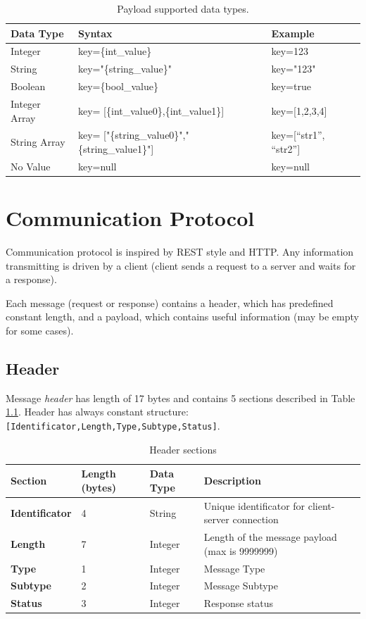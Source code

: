 \documentclass[english, sem, kiv, he, iso690alph, pdf, viewonly]{fasthesis}
\begin{document}
\begin{table}[h]
	\centering
	\begin{tabular}{|l|l|l|}
		\hline
		\textbf{Data Type} & \textbf{Syntax} & \textbf{Example} 	\\ \hline
		Integer & key=\{int\_value\} & key=123 \\ \hline
		String 	& key="\{string\_value\}" & key="123" \\ \hline
		Boolean	& key=\{bool\_value\} & key=true \\ \hline
		Integer Array	& key= [\{int\_value0\},\{int\_value1\}] & key=[1,2,3,4] \\ \hline
		String Array	& key= ["\{string\_value0\}","\{string\_value1\}"] & key=[“str1”, “str2”] \\ \hline
		No Value	& key=null & key=null \\ \hline
	\end{tabular}
	\caption{Payload supported data types.}
	\label{tab:payload_data_types}
\end{table}

\chapter{Communication Protocol}

Communication protocol is inspired by \ac{REST} style and \ac{HTTP}. Any information transmitting is driven by a client (client sends a request to a server and waits for a response).

Each message (request or response) contains a header, which has predefined constant length, and a payload, which contains useful information (may be empty for some cases).

\section{Header}

Message \textit{header} has length of 17 bytes and contains 5 sections described in Table \ref{tab:header_sections}. Header has always constant structure: \texttt{[Identificator,Length,Type,Subtype,Status]}.

\begin{table}[h]
	\centering
	\begin{tabular}{|l|l|l|l|}
		\hline
		\textbf{Section} & \textbf{Length (bytes)} & \textbf{Data Type} & \textbf{Description}	\\ \hline
		\textbf{Identificator} & 4 & String & Unique identificator for client-server connection \\ \hline
		\textbf{Length} & 7 & Integer & Length of the message payload (max is 9999999) \\ \hline
		\textbf{Type} & 1 & Integer & Message Type \\ \hline
		\textbf{Subtype} & 2 & Integer & Message Subtype \\ \hline
		\textbf{Status} & 3 & Integer & Response status \\ \hline
	\end{tabular}
	\caption{Header sections}
	\label{tab:header_sections}
\end{table}
\end{document}
